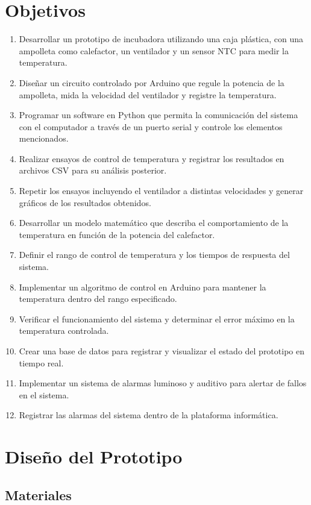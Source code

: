 \documentclass[spanish, a4paper, 11pt]{article}
\begin{document}
\section{Objetivos}

\begin{enumerate}
    \item Desarrollar un prototipo de incubadora utilizando una caja plástica, con una ampolleta como calefactor, un ventilador y un sensor NTC para medir la temperatura.
    \item Diseñar un circuito controlado por Arduino que regule la potencia de la ampolleta, mida la velocidad del ventilador y registre la temperatura.
    \item Programar un software en Python que permita la comunicación del sistema con el computador a través de un puerto serial y controle los elementos mencionados.
    \item Realizar ensayos de control de temperatura y registrar los resultados en archivos CSV para su análisis posterior.
    \item Repetir los ensayos incluyendo el ventilador a distintas velocidades y generar gráficos de los resultados obtenidos.
    \item Desarrollar un modelo matemático que describa el comportamiento de la temperatura en función de la potencia del calefactor.
    \item Definir el rango de control de temperatura y los tiempos de respuesta del sistema.
    \item Implementar un algoritmo de control en Arduino para mantener la temperatura dentro del rango especificado.
    \item Verificar el funcionamiento del sistema y determinar el error máximo en la temperatura controlada.
    \item Crear una base de datos para registrar y visualizar el estado del prototipo en tiempo real.
    \item Implementar un sistema de alarmas luminoso y auditivo para alertar de fallos en el sistema.
    \item Registrar las alarmas del sistema dentro de la plataforma informática.
\end{enumerate}

\section{Diseño del Prototipo}

\subsection{Materiales}
\end{document}
